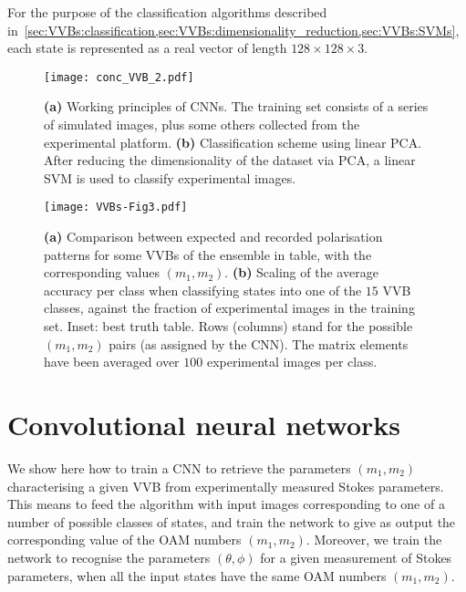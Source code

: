 For the purpose of the classification algorithms described in~\cref{sec:VVBs:classification,sec:VVBs:dimensionality_reduction,sec:VVBs:SVMs}, each state is represented as a real vector of length $128\times128\times 3$.


\begin{figure}[tb]
	\centering
	\texttt{[image: conc\_VVB\_2.pdf]}
	\caption{
	\textbf{(a)}
	Working principles of \acp{CNN}. The training set consists of a series of simulated images, plus some others collected from the experimental platform.
	\textbf{(b)}
	Classification scheme using linear \ac{PCA}.
	After reducing the dimensionality of the dataset via \ac{PCA}, a linear \ac{SVM} is used to classify experimental images. 
	}
	\label{fig:VVBs:class_techniques}
\end{figure}

\begin{figure}[tb]
    \centering
    \texttt{[image: VVBs-Fig3.pdf]}
    \caption{
	    \textbf{(a)} Comparison between expected and recorded polarisation patterns for some \acp{VVB} of the ensemble in table, with the corresponding values $(m_1,m_2)$.
	    \textbf{(b)} Scaling of the average accuracy per class when classifying states into one of the $15$ VVB classes,
	    against the fraction of experimental images in the training set. 
	    Inset: best truth table.
	    Rows (columns) stand for the possible $(m_1,m_2)$ pairs (as assigned by the CNN). The matrix elements have been averaged over $100$ experimental images per class.
    }%
    \label{fig:VVBs:resultsCNN}
\end{figure}



\section{Convolutional neural networks}
\label{sec:VVBs:CNNs}

We show here how to train a \ac{CNN} to retrieve the parameters $(m_1,m_2)$ characterising a given VVB from experimentally measured Stokes parameters.
This means to feed the algorithm with input images corresponding to one of a number of possible classes of states, and train the network to give as output the corresponding value of the OAM numbers $(m_1,m_2)$.
Moreover, we train the network to recognise the parameters $(\theta,\phi)$ for a given measurement of Stokes parameters, when all the input states have the same OAM numbers $(m_1,m_2)$.

